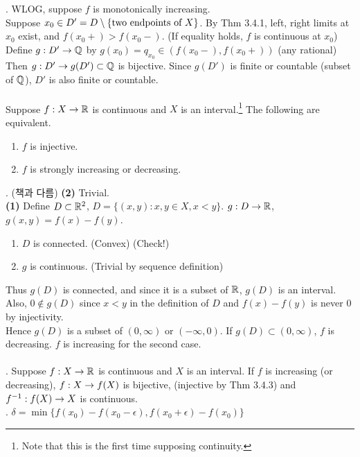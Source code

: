 \pf. WLOG, suppose $f$ is monotonically increasing.\\
Suppose $x_0\in D' = D\setminus \{\text{two endpoints of } X\}$. By Thm 3.4.1, left, right limits at $x_0$ exist, and $f(x_0+) > f(x_0-)$. (If equality holds, $f$ is continuous at $x_0$)\\
Define $g: D'\rightarrow \mathbb{Q}$ by $g(x_0) = q_{x_0}\in (f(x_0-), f(x_0+))$ (any rational) Then $g:D'\rightarrow g(D') \subset \mathbb{Q}$ is bijective. Since $g(D')$ is finite or countable (subset of $\mathbb{Q}$), $D'$ is also finite or countable.\\
\\
 Suppose $f:X\rightarrow\mathbb{R}$ is continuous and $X$ is an interval.\footnote{Note that this is the first time supposing continuity.} The following are equivalent.
\begin{enumerate}
	\item $f$ is injective.
	\item $f$ is strongly increasing or decreasing.
\end{enumerate}
\pf. (책과 다름) \textbf{(2)} Trivial.\\
\textbf{(1)} Define $D\subset \mathbb{R}^2$, $D = \{(x, y) : x, y\in X, x<y\}$. $g:D\rightarrow \mathbb{R}$, $g(x, y) = f(x) - f(y)$.
\begin{enumerate}
	\item $D$ is connected. (Convex) (Check!)
	\item $g$ is continuous. (Trivial by sequence definition)
\end{enumerate}
Thus $g(D)$ is connected, and since it is a subset of $\mathbb{R}$, $g(D)$ is an interval. Also, $0\notin g(D)$ since $x<y$ in the definition of $D$ and $f(x)-f(y)$ is never 0 by injectivity.\\
Hence $g(D)$ is a subset of $(0, \infty)$ or $(-\infty, 0)$. If $g(D)\subset (0, \infty)$, $f$ is decreasing. $f$ is increasing for the second case.\\
\\
\rmk. Suppose $f:X\rightarrow \mathbb{R}$ is continuous and $X$ is an interval. If $f$ is increasing (or decreasing), $f:X\rightarrow f(X)$ is bijective, (injective by Thm 3.4.3) and $f^{-1}:f(X)\rightarrow X$ is continuous.\\
\pf. $\delta = \min\{f(x_0) - f(x_0-\epsilon), f(x_0+\epsilon) - f(x_0) \}$








\pagebreak